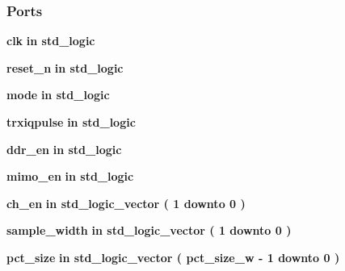 \subsubsection*{Ports}
 \begin{DoxyCompactItemize}
\item 
{\bf clk}  {\bfseries {\bfseries \textcolor{keywordflow}{in}\textcolor{vhdlchar}{ }}} {\bfseries \textcolor{comment}{std\+\_\+logic}\textcolor{vhdlchar}{ }} 
\item 
{\bf reset\+\_\+n}  {\bfseries {\bfseries \textcolor{keywordflow}{in}\textcolor{vhdlchar}{ }}} {\bfseries \textcolor{comment}{std\+\_\+logic}\textcolor{vhdlchar}{ }} 
\item 
{\bf mode}  {\bfseries {\bfseries \textcolor{keywordflow}{in}\textcolor{vhdlchar}{ }}} {\bfseries \textcolor{comment}{std\+\_\+logic}\textcolor{vhdlchar}{ }} 
\item 
{\bf trxiqpulse}  {\bfseries {\bfseries \textcolor{keywordflow}{in}\textcolor{vhdlchar}{ }}} {\bfseries \textcolor{comment}{std\+\_\+logic}\textcolor{vhdlchar}{ }} 
\item 
{\bf ddr\+\_\+en}  {\bfseries {\bfseries \textcolor{keywordflow}{in}\textcolor{vhdlchar}{ }}} {\bfseries \textcolor{comment}{std\+\_\+logic}\textcolor{vhdlchar}{ }} 
\item 
{\bf mimo\+\_\+en}  {\bfseries {\bfseries \textcolor{keywordflow}{in}\textcolor{vhdlchar}{ }}} {\bfseries \textcolor{comment}{std\+\_\+logic}\textcolor{vhdlchar}{ }} 
\item 
{\bf ch\+\_\+en}  {\bfseries {\bfseries \textcolor{keywordflow}{in}\textcolor{vhdlchar}{ }}} {\bfseries \textcolor{comment}{std\+\_\+logic\+\_\+vector}\textcolor{vhdlchar}{ }\textcolor{vhdlchar}{(}\textcolor{vhdlchar}{ }\textcolor{vhdlchar}{ } \textcolor{vhdldigit}{1} \textcolor{vhdlchar}{ }\textcolor{keywordflow}{downto}\textcolor{vhdlchar}{ }\textcolor{vhdlchar}{ } \textcolor{vhdldigit}{0} \textcolor{vhdlchar}{ }\textcolor{vhdlchar}{)}\textcolor{vhdlchar}{ }} 
\item 
{\bf sample\+\_\+width}  {\bfseries {\bfseries \textcolor{keywordflow}{in}\textcolor{vhdlchar}{ }}} {\bfseries \textcolor{comment}{std\+\_\+logic\+\_\+vector}\textcolor{vhdlchar}{ }\textcolor{vhdlchar}{(}\textcolor{vhdlchar}{ }\textcolor{vhdlchar}{ } \textcolor{vhdldigit}{1} \textcolor{vhdlchar}{ }\textcolor{keywordflow}{downto}\textcolor{vhdlchar}{ }\textcolor{vhdlchar}{ } \textcolor{vhdldigit}{0} \textcolor{vhdlchar}{ }\textcolor{vhdlchar}{)}\textcolor{vhdlchar}{ }} 
\item 
{\bf pct\+\_\+size}  {\bfseries {\bfseries \textcolor{keywordflow}{in}\textcolor{vhdlchar}{ }}} {\bfseries \textcolor{comment}{std\+\_\+logic\+\_\+vector}\textcolor{vhdlchar}{ }\textcolor{vhdlchar}{(}\textcolor{vhdlchar}{ }\textcolor{vhdlchar}{ }\textcolor{vhdlchar}{ }\textcolor{vhdlchar}{ }{\bfseries {\bf pct\+\_\+size\+\_\+w}} \textcolor{vhdlchar}{-\/}\textcolor{vhdlchar}{ } \textcolor{vhdldigit}{1} \textcolor{vhdlchar}{ }\textcolor{keywordflow}{downto}\textcolor{vhdlchar}{ }\textcolor{vhdlchar}{ } \textcolor{vhdldigit}{0} \textcolor{vhdlchar}{ }\textcolor{vhdlchar}{)}\textcolor{vhdlchar}{ }} 

\end{DoxyCompactItemize}
